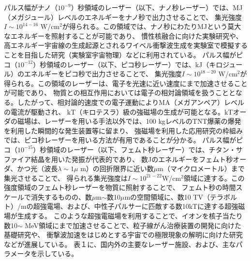 \documentclass[a4paper,11pt,titlepage]{jsarticle}
\begin{document}
  パルス幅がナノ（$10^{-9}$）秒領域のレーザー（以下、ナノ秒レーザー）では、MJ（メガジュール）レベルのエネルギーをナノ秒で出力させることで、
  集光強度$I \sim 10^{14-16}$ W/cm$^{2}$が得られる。この領域では、ナノ秒にわたりMJという莫大なエネルギーを照射することが可能であり、
  慣性核融合に向けた実験研究や、高エネルギー宇宙線の生成起源とされるワイベル衝撃波生成を実験室で模擬することを目指した研究（実験室宇宙物理）などに利用されている。
  パルス幅がピコ（$10^{-12}$）秒領域のレーザー（以下、ピコ秒レーザー）では、kJ（キロジュール）のエネルギーをピコ秒で出力させることで、
  集光強度$I\sim 10^{18-20}$ W/cm$^2$が得られる。この領域のレーザーは、電子を光速に近い速度にまで加速させることが可能であり、
  物質との相互作用においては電子の相対論領域を扱うこととなる。したがって、相対論的速度での電子運動によりMA（メガアンペア）レベルの電流が駆動され、
  kT（キロテスラ）級の強磁場の生成が可能となる。kTオーダの磁場は、レーザーを用いる手法以外では、100 kgレベルのTNT爆薬の爆発を利用した瞬間的な発生装置等に留まり、
  強磁場を利用した応用研究の枠組みでは、ピコ秒レーザーを用いる方法が有用であることが分かる。
  パルス幅がピコ（$10^{-15}$）秒領域のレーザー（以下、フェムト秒レーザー）では、チタン・サファイア結晶を用いた発振が代表的であり、
  数Jのエネルギーをフェムト秒オーダ、かつ光（波長$\lambda \sim 1 \mu$ m）の回折限界に近い数$\mu$m（マイクロメートル）まで集光させることで、
  得られる集光強度は$I \sim 10^{21-22} $W/cm$^{2}$領域に達する。この強度領域のフェムト秒レーザーを物質に照射することで、
  フェムト秒の時間スケールで消失するものの、数$\mu$m$\sim$数10$\mu$mの空間領域に、数10 TV（テラボルト）/mの超強電場、および、中性子パルサーに匹敵する数10kTに達する超強磁場が生成する。
  このような超強電磁場を利用することで、イオンを核子当たり数10$\sim$ MeV領域にまで加速させることで、粒子線がん治療装置の開発に向けた基礎研究や、
  衝撃波加速をはじめとする宇宙での極限現象の解明に向けた研究などが進展している。
  表１に、国内外の主要なレーザー施設、および、主なパラメータを示している。
\end{document}
